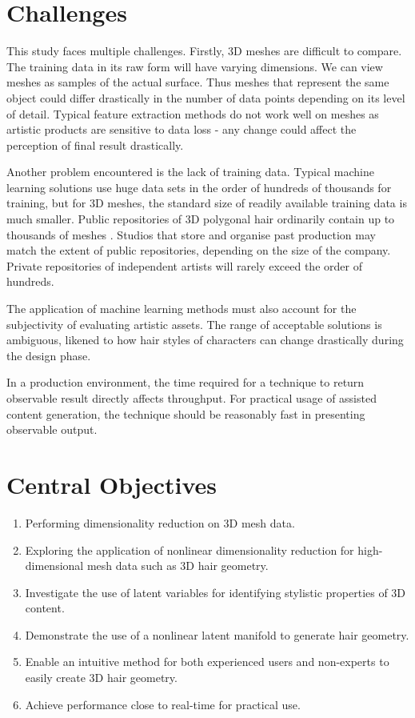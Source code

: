 \documentclass[ %
author={Dillon Keith Diep},
supervisor={Dr. Carl Henrik Ek},
degree={MEng},
title={ART-CG Hair:},
subtitle={Assisted Real-time Content Generation of Stylised Virtual Hair},
type={Research},
year={2017} ]{dissertation}
\begin{document}
	\section{Challenges}
	This study faces multiple challenges. Firstly, 3D meshes are difficult to compare. The training data in its raw form will have varying dimensions. We can view meshes as samples of the actual surface. Thus meshes that represent the same object could differ drastically in the number of data points depending on its level of detail. Typical feature extraction methods do not work well on meshes as artistic products are sensitive to data loss - any change could affect the perception of final result drastically.
	
	Another problem encountered is the lack of training data. Typical machine learning solutions use huge data sets in the order of hundreds of thousands for training, but for 3D meshes, the standard size of readily available training data is much smaller. Public repositories of 3D polygonal hair ordinarily contain up to thousands of meshes \cite{tsr}. Studios that store and organise past production may match the extent of public repositories, depending on the size of the company. Private repositories of independent artists will rarely exceed the order of hundreds.
	
	The application of machine learning methods must also account for the subjectivity of evaluating artistic assets. The range of acceptable solutions is ambiguous, likened to how hair styles of characters can change drastically during the design phase.
	
	In a production environment, the time required for a technique to return observable result directly affects throughput. For practical usage of assisted content generation, the technique should be reasonably fast in presenting observable output.
	
	\section{Central Objectives}
	\label{chap:context:objectives}
	\begin{enumerate}
		\item Performing dimensionality reduction on 3D mesh data.
		\item Exploring the application of nonlinear dimensionality reduction for high-dimensional mesh data such as 3D hair geometry.
		\item Investigate the use of latent variables for identifying stylistic properties of 3D content.
		\item Demonstrate the use of a nonlinear latent manifold to generate hair geometry.
		\item Enable an intuitive method for both experienced users and non-experts to easily create 3D hair geometry.
		\item Achieve performance close to real-time for practical use.
	\end{enumerate}
	
\end{document}
